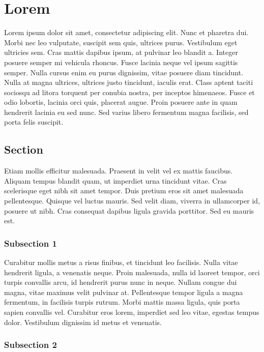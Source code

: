 \chapter{Lorem}

Lorem ipsum dolor sit amet, consectetur adipiscing elit. Nunc et pharetra dui. Morbi nec leo vulputate, suscipit sem quis, ultrices purus. Vestibulum eget ultricies sem. Cras mattis dapibus ipsum, at pulvinar leo blandit a. Integer posuere semper mi vehicula rhoncus. Fusce lacinia neque vel ipsum sagittis semper. Nulla cursus enim eu purus dignissim, vitae posuere diam tincidunt. Nulla at magna ultrices, ultrices justo tincidunt, iaculis erat. Class aptent taciti sociosqu ad litora torquent per conubia nostra, per inceptos himenaeos. Fusce et odio lobortis, lacinia orci quis, placerat augue. Proin posuere ante in quam hendrerit lacinia eu sed nunc. Sed varius libero fermentum magna facilisis, sed porta felis suscipit. \citep{commonmark}

\section{Section}

Etiam mollis efficitur malesuada. Praesent in velit vel ex mattis faucibus. Aliquam tempus blandit quam, ut imperdiet urna tincidunt vitae. Cras scelerisque eget nibh sit amet tempor. Duis pretium eros sit amet malesuada pellentesque. Quisque vel luctus mauris. Sed velit diam, viverra in ullamcorper id, posuere ut nibh. Cras consequat dapibus ligula gravida porttitor. Sed eu mauris est.

\subsection{Subsection 1}

Curabitur mollis metus a risus finibus, et tincidunt leo facilisis. Nulla vitae hendrerit ligula, a venenatis neque. Proin malesuada, nulla id laoreet tempor, orci turpis convallis arcu, id hendrerit purus nunc in neque. Nullam congue dui magna, vitae maximus velit pulvinar at. Pellentesque tempor ligula a magna fermentum, in facilisis turpis rutrum. Morbi mattis massa ligula, quis porta sapien convallis vel. Curabitur eros lorem, imperdiet sed leo vitae, egestas tempus dolor. Vestibulum dignissim id metus et venenatis.

\subsection{Subsection 2}

